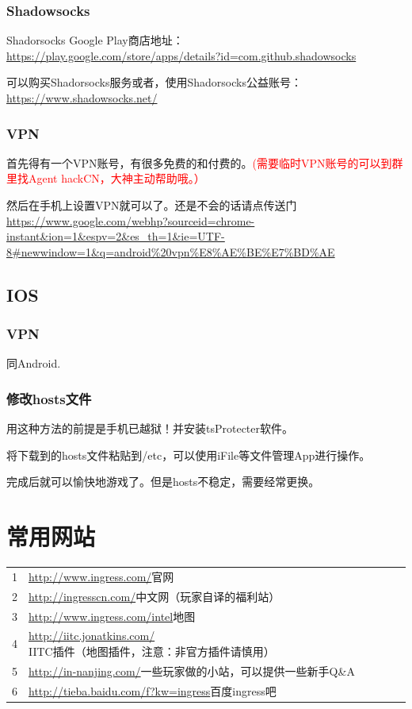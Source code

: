 \documentclass[12pt]{article}
\theoremstyle{definition}
\theoremstyle{remark}
\numberwithin{equation}{section}
\begin{document}
\subsubsection{Shadowsocks}
Shadorsocks Google Play商店地址：\\
\url{https://play.google.com/store/apps/details?id=com.github.shadowsocks}\par
可以购买Shadorsocks服务或者，使用Shadorsocks公益账号：\\
\url{https://www.shadowsocks.net/}

\subsubsection{VPN}
首先得有一个VPN账号，有很多免费的和付费的。\textcolor{red}{(需要临时VPN账号的可以到群里找Agent hackCN，大神主动帮助哦。）}\par
然后在手机上设置VPN就可以了。还是不会的话请点传送门\\
\url{https://www.google.com/webhp?sourceid=chrome-instant&ion=1&espv=2&es_th=1&ie=UTF-8#newwindow=1&q=android\%20vpn\%E8\%AE\%BE\%E7\%BD\%AE}

\subsection{IOS}
\subsubsection{VPN}
同Android.

\subsubsection{修改hosts文件}
用这种方法的前提是手机已越狱！并安装tsProtecter软件。\par
将下载到的hosts文件粘贴到/etc，可以使用iFile等文件管理App进行操作。\par
完成后就可以愉快地游戏了。但是hosts不稳定，需要经常更换。

\section{常用网站}
\begin{longtable}{ll}
1& \url{http://www.ingress.com/}官网\\
2& \url{http://ingresscn.com/}中文网（玩家自译的福利站）\\
3& \url{http://www.ingress.com/intel}地图\\
4& \url{http://iitc.jonatkins.com/}IITC插件（地图插件，注意：非官方插件请慎用）\\
5& \url{http://in-nanjing.com/}一些玩家做的小站，可以提供一些新手Q\&A\\
6& \url{http://tieba.baidu.com/f?kw=ingress}百度ingress吧
\end{longtable}
\end{document}
